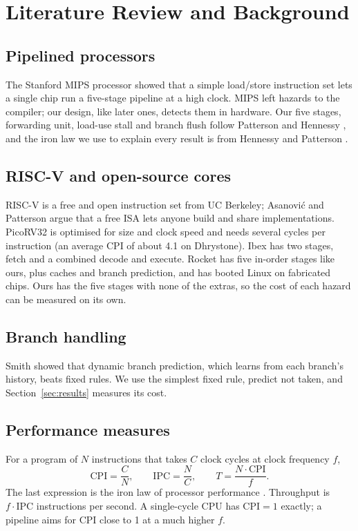 \section{Literature Review and Background}
\label{sec:background}

\subsection{Pipelined processors}
The Stanford MIPS processor \cite{hennessy1982} showed that a simple
load/store instruction set lets a single chip run a five-stage pipeline at a
high clock. MIPS left hazards to the compiler; our design, like later ones,
detects them in hardware. Our five stages, forwarding unit, load-use stall and
branch flush follow Patterson and Hennessy \cite{patterson2021}, and the iron
law we use to explain every result is from Hennessy and Patterson
\cite{hennessy2019}.

\subsection{RISC-V and open-source cores}
RISC-V is a free and open instruction set from UC Berkeley; Asanovi\'c and
Patterson \cite{asanovic2014} argue that a free ISA lets anyone build and
share implementations. PicoRV32 \cite{picorv32} is optimised for size and
clock speed and needs several cycles per instruction (an average CPI of about
4.1 on Dhrystone). Ibex \cite{ibex} has two stages, fetch and a combined
decode and execute. Rocket \cite{rocketchip} has five in-order stages like
ours, plus caches and branch prediction, and has booted Linux on fabricated
chips. Ours has the five stages with none of the extras, so the cost of each
hazard can be measured on its own.

\subsection{Branch handling}
Smith \cite{smith1981} showed that dynamic branch prediction, which learns
from each branch's history, beats fixed rules. We use the simplest fixed
rule, predict not taken, and Section~\ref{sec:results} measures its cost.

\subsection{Performance measures}
For a program of $N$ instructions that takes $C$ clock cycles at clock
frequency $f$,
\begin{equation}
\mathrm{CPI} = \frac{C}{N}, \qquad \mathrm{IPC} = \frac{N}{C}, \qquad
T = \frac{N \cdot \mathrm{CPI}}{f}.
\label{eq:ironlaw}
\end{equation}
The last expression is the iron law of processor performance
\cite{hennessy2019}. Throughput is $f \cdot \mathrm{IPC}$ instructions per
second. A single-cycle CPU has $\mathrm{CPI}=1$ exactly; a pipeline aims for
CPI close to 1 at a much higher $f$.

